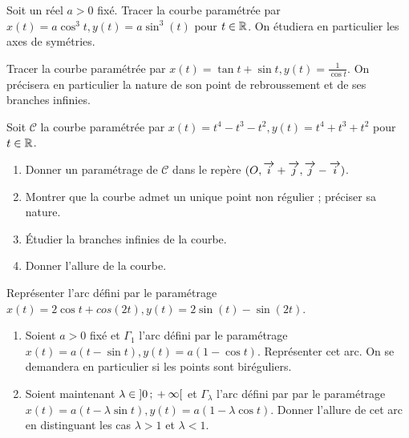 \begin{exercice}[Astroïde]
  Soit un réel \(a > 0\) fixé. Tracer la courbe paramétrée par \(x(t) = a
  \cos^3 t, y(t) = a \sin^3(t)\) pour \(t \in \mathbb{R}\). On étudiera en particulier
  les axes de symétries.
\end{exercice}

\begin{exercice}
  Tracer la courbe paramétrée par \(x(t) = \tan t + \sin t, y(t) =
  \frac{1}{\cos t}\). On précisera en particulier la nature de son point de
  rebroussement et de ses branches infinies.
\end{exercice}

\begin{exercice}
  Soit \(\mathcal{C}\) la courbe paramétrée par \(x(t) = t^4 - t^3 - t^2, y(t)
  = t^4 + t^3 + t^2\) pour \(t \in \mathbb{R}\).
  \begin{enumerate}
    \item Donner un paramétrage de \(\mathcal{C}\) dans le repère \((O, \overrightarrow{i} +
      \overrightarrow{j}, \overrightarrow{j}-\overrightarrow{i})\).
    \item Montrer que la courbe admet un unique point non régulier ; préciser
      sa nature.
    \item Étudier la branches infinies de la courbe.
    \item Donner l'allure de la courbe.
  \end{enumerate}
\end{exercice}

\begin{exercice}[Deltoïde]
  Représenter l'arc défini par le paramétrage \(x(t) = 2 \cos t + cos(2t),
  y(t) = 2\sin(t) - \sin(2t)\).
\end{exercice}

\begin{exercice}[Cycloïde]
  \begin{enumerate}
    \item Soient \(a>0\) fixé et \(\Gamma_1\) l'arc défini par le paramétrage
      \(x(t) = a(t-\sin t), y(t) = a(1-\cos t)\). Représenter cet arc. On se
      demandera en particulier si les points sont biréguliers.
    \item Soient maintenant \(\lambda \in \left] 0 \, ; {} +\infty \right[\) et
      \(\Gamma_\lambda\) l'arc défini par par le paramétrage \(x(t) =
      a(t-\lambda \sin t), y(t) = a(1-\lambda \cos t)\). Donner l'allure de
      cet arc en distinguant les cas \(\lambda >1\) et \(\lambda < 1\).
  \end{enumerate}
\end{exercice}

